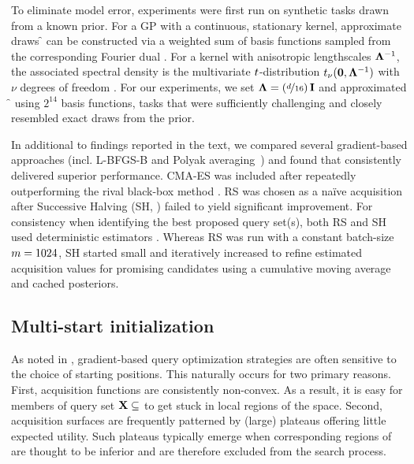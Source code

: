 To eliminate model error, experiments were first run on synthetic tasks drawn from a known prior. For a GP with a continuous, stationary kernel, approximate draws \f{} can be constructed via a weighted sum of basis functions sampled from the corresponding Fourier dual \cite{bochner1959lectures, rasmussen-book06a, rahimi2008random, hernandez-nips14}. For a  kernel with anisotropic lengthscales \(\boldsymbol{\Lambda}^{-1}\), the associated spectral density is the multivariate \(\mathnormal{t}\)-distribution \(t_{\nu}(\mathbf{0}, \boldsymbol{\Lambda}^{-1})\) with \(\nu\) degrees of freedom \cite{kotz2004multivariate}. For our experiments, we set \(\boldsymbol{\Lambda} = (\nicefrac{d}{16})\,\mathbf{I} \) and approximated \f{} using \(2^{14}\) basis functions,  tasks that were sufficiently challenging and closely resembled exact draws from the prior.

 In additional to findings reported in the text, we compared several gradient-based approaches (incl. L-BFGS-B and Polyak averaging~\cite{wang2016parallel}) and found that \adam{} consistently delivered superior performance. CMA-ES was included after repeatedly outperforming the rival black-box method \direct{} \cite{jones1993lipschitzian}. RS was chosen as a na\"ive acquisition \solver{} after Successive Halving (SH, \cite{karnin2013almost,jamieson2016non}) failed to yield significant improvement.
For consistency when identifying the best proposed query set(s), both RS and SH used deterministic estimators \AcqMC{}. Whereas RS was run with a constant batch-size \(m=1024\), SH started small and iteratively increased \nSamples{} to refine estimated acquisition values for promising candidates using a cumulative moving average and cached posteriors.

\subsection{Multi-start initialization}
\label{appendix:initialization}
As noted in \cite{wang2016parallel}, gradient-based query optimization strategies are often sensitive to the choice of starting positions. This  naturally occurs for two primary reasons. 
% 
First, acquisition functions \Acq{} are consistently non-convex. As a result, it is easy for members of query set \(\mathbf{X} \subseteq \) to get stuck in local regions of the space. 
% 
Second, acquisition surfaces are frequently patterned by (large) plateaus offering little expected utility. Such plateaus typically emerge when corresponding regions of \xspace{} are thought to be inferior and are therefore excluded from the search process.

